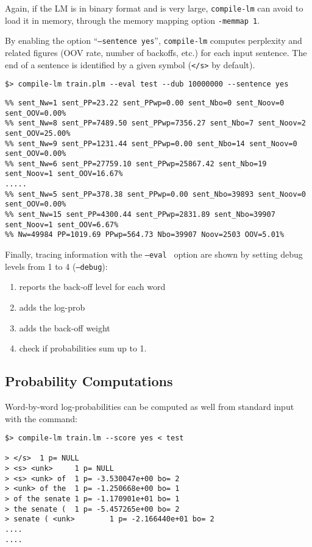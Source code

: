 \documentclass[11pt]{article}
\begin{document}
\bigskip
\noindent
Again, if the LM is in binary format and is very large, {\tt compile-lm} can avoid to load it in memory,
through the memory mapping option {\tt -memmap 1}.

\bigskip
\noindent
By enabling the option ``{\tt --sentence yes}'', {\tt compile-lm} computes perplexity and related figures (OOV rate, number of backoffs, etc.) for each input sentence. The end of a sentence is identified by a given symbol ({\tt </s>} by default).
\begin{verbatim}
$> compile-lm train.plm --eval test --dub 10000000 --sentence yes	
\end{verbatim}
{\small 
\begin{verbatim}
%% sent_Nw=1 sent_PP=23.22 sent_PPwp=0.00 sent_Nbo=0 sent_Noov=0 sent_OOV=0.00%
%% sent_Nw=8 sent_PP=7489.50 sent_PPwp=7356.27 sent_Nbo=7 sent_Noov=2 sent_OOV=25.00%
%% sent_Nw=9 sent_PP=1231.44 sent_PPwp=0.00 sent_Nbo=14 sent_Noov=0 sent_OOV=0.00%
%% sent_Nw=6 sent_PP=27759.10 sent_PPwp=25867.42 sent_Nbo=19 sent_Noov=1 sent_OOV=16.67%
.....
%% sent_Nw=5 sent_PP=378.38 sent_PPwp=0.00 sent_Nbo=39893 sent_Noov=0 sent_OOV=0.00%
%% sent_Nw=15 sent_PP=4300.44 sent_PPwp=2831.89 sent_Nbo=39907 sent_Noov=1 sent_OOV=6.67%
%% Nw=49984 PP=1019.69 PPwp=564.73 Nbo=39907 Noov=2503 OOV=5.01%
\end{verbatim}
}

\bigskip
\noindent
Finally, tracing information with the {\tt --eval }  option are shown by setting 
debug levels from 1 to 4 ({\tt --debug}):
\begin{enumerate}
\item reports the back-off level for each word
\item adds the log-prob 
\item adds the back-off weight
\item check if probabilities sum up to 1.
\end{enumerate}


\subsection{Probability Computations}
Word-by-word log-probabilities  can be computed as well from standard input with the command:
\begin{verbatim}
$> compile-lm train.lm --score yes < test

> </s>  1 p= NULL
> <s> <unk>     1 p= NULL
> <s> <unk> of  1 p= -3.530047e+00 bo= 2
> <unk> of the  1 p= -1.250668e+00 bo= 1
> of the senate 1 p= -1.170901e+01 bo= 1
> the senate (  1 p= -5.457265e+00 bo= 2
> senate ( <unk>        1 p= -2.166440e+01 bo= 2
....
....
\end{verbatim}
\end{document}
